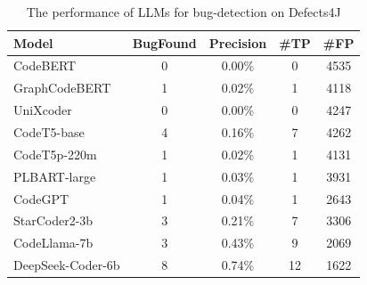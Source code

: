 \begin{table}[ht]
\centering
\small
\caption{The performance of LLMs for bug-detection on Defects4J}
\label{tab:bug-detection}
\begin{tabular}{lcccc}
\toprule
\textbf{Model} & \textbf{BugFound} & \textbf{Precision} & \textbf{\#TP} & \textbf{\#FP} \\
\midrule
CodeBERT & 0 & 0.00\% & 0 & 4535 \\
GraphCodeBERT & 1 & 0.02\% & 1 & 4118 \\
UniXcoder & 0 & 0.00\% & 0 & 4247 \\
CodeT5-base & 4 & 0.16\% & 7 & 4262 \\
CodeT5p-220m & 1 & 0.02\% & 1 & 4131 \\
PLBART-large & 1 & 0.03\% & 1 & 3931 \\
CodeGPT & 1 & 0.04\% & 1 & 2643 \\
StarCoder2-3b & 3 & 0.21\% & 7 & 3306 \\
CodeLlama-7b & 3 & 0.43\% & 9 & 2069 \\
DeepSeek-Coder-6b & 8 & 0.74\% & 12 & 1622 \\
\bottomrule
\end{tabular}
\end{table}

